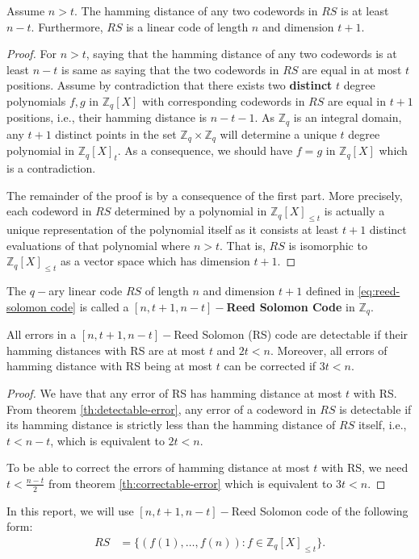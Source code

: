 \begin{lemma}
  Assume $n>t$. The hamming distance of any two codewords in $RS$ is at least $n-t$. Furthermore, $RS$ is 
  a linear code of length $n$ and dimension $t+1$.
\end{lemma}
\begin{proof}
  For $n>t$, saying that the hamming distance of any two codewords is at least $n-t$ is same as saying 
  that the two codewords in $RS$ are equal in at most $t$ positions. Assume by contradiction that 
  there exists two \textbf{distinct} $t$ degree polynomials $f,g$ in $\mathbb{Z}_q[X]$ with corresponding 
  codewords in $RS$ are equal in $t+1$ positions, i.e., their hamming distance is $n-t-1$. As 
  $\mathbb{Z}_q$ is an integral domain, any $t+1$ distinct points in the set 
  $\mathbb{Z}_q\times\mathbb{Z}_q$ will determine a unique $t$ degree polynomial in $\mathbb{Z}_q[X]_t$. 
  As a consequence, we should have $f=g$ in $\mathbb{Z}_q[X]$ which is a contradiction.\par 

  The remainder of the proof is by a consequence of the first part. More precisely, each codeword in 
  $RS$ determined by a polynomial in $\mathbb{Z}_q[X]_{\leq t}$ is actually a unique representation of the 
  polynomial itself as it consists at least $t+1$ distinct evaluations of that polynomial where $n>t$. 
  That is, $RS$ is isomorphic to $\mathbb{Z}_q[X]_{\leq t}$ as a vector space which has dimension $t+1$.
\end{proof}

\begin{definition}
  The $q-$ary linear code $RS$ of length $n$ and dimension $t+1$ defined in \eqref{eq:reed-solomon code} 
  is called a \textbf{$[n, t+1, n-t]-$Reed Solomon Code}\cite{../doi:10.1137/0108018} in $\mathbb{Z}_q$.
\end{definition}

\begin{corollary}\label{cor:detectable-correctable RS}
  All errors in a $[n, t+1, n-t]-$Reed Solomon (RS) code are detectable if their hamming distances with 
  RS are at most $t$ and $2t<n$. Moreover, all errors of hamming distance with RS being at most $t$ can 
  be corrected if $3t<n$.
\end{corollary}
\begin{proof}
  We have that any error of RS has hamming distance at most $t$ with RS. From theorem 
  \ref{th:detectable-error}, any error of a codeword in $RS$ is detectable if its hamming 
  distance is strictly less than the hamming distance of $RS$ itself, i.e., $t<n-t$, which is equivalent 
  to $2t<n$.\par

  To be able to correct the errors of hamming distance at most $t$ with RS, we need $t<\frac{n-t}{2}$ from 
  theorem \ref{th:correctable-error} which is equivalent to $3t<n$.
\end{proof}

In this report, we will use $[n, t+1, n-t]-$Reed Solomon code of the following form:
\begin{align}\label{eq:reed-solomon code-2}
  RS &= \{(f(1),\dots,f(n)) : f\in \mathbb{Z}_q[X]_{\leq t}\}.
\end{align}

